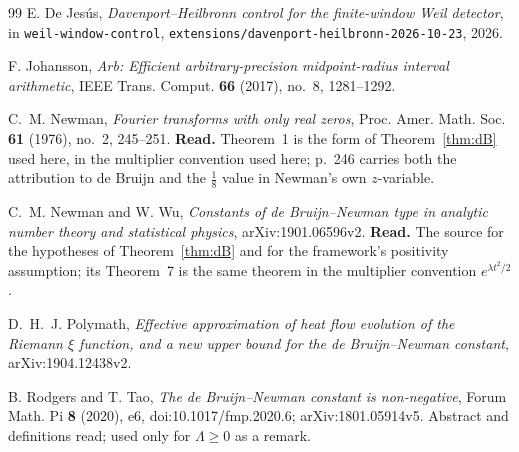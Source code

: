 \documentclass[11pt,a4paper]{article}
\theoremstyle{remark}
\begin{document}
\begin{thebibliography}{99}
 E. De Jes\'us,
\emph{Davenport--Heilbronn control for the finite-window Weil detector},
in \texttt{weil-window-control}, \texttt{extensions/davenport-heilbronn-2026-10-23}, 2026.

 F. Johansson,
\emph{Arb: Efficient arbitrary-precision midpoint-radius interval arithmetic},
IEEE Trans. Comput. \textbf{66} (2017), no.~8, 1281--1292.

 C.~M. Newman,
\emph{Fourier transforms with only real zeros},
Proc. Amer. Math. Soc. \textbf{61} (1976), no.~2, 245--251.
\textbf{Read.} Theorem~1 is the form of Theorem~\ref{thm:dB} used here, in the multiplier
convention used here; p.~246 carries both the attribution to de Bruijn and the
$\tfrac{1}{8}$ value in Newman's own $z$-variable.

 C.~M. Newman and W. Wu,
\emph{Constants of de Bruijn--Newman type in analytic number theory and statistical
physics}, arXiv:1901.06596v2. \textbf{Read.} The source for the hypotheses of
Theorem~\ref{thm:dB} and for the framework's positivity assumption; its Theorem~7 is the
same theorem in the multiplier convention $e^{\lambda t^2/2}$.

 D.~H.~J. Polymath,
\emph{Effective approximation of heat flow evolution of the Riemann $\xi$ function, and a
new upper bound for the de Bruijn--Newman constant}, arXiv:1904.12438v2.

 B. Rodgers and T. Tao,
\emph{The de Bruijn--Newman constant is non-negative},
Forum Math. Pi \textbf{8} (2020), e6, doi:10.1017/fmp.2020.6; arXiv:1801.05914v5.
Abstract and definitions read; used only for $\Lambda\ge0$ as a remark.

\end{thebibliography}
\end{document}
